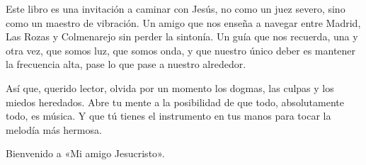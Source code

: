 Este libro es una invitación a caminar con Jesús, no como un juez severo, sino como un maestro de vibración. Un amigo que nos enseña a navegar entre Madrid, Las Rozas y Colmenarejo sin perder la sintonía. Un guía que nos recuerda, una y otra vez, que somos luz, que somos onda, y que nuestro único deber es mantener la frecuencia alta, pase lo que pase a nuestro alrededor.

Así que, querido lector, olvida por un momento los dogmas, las culpas y los miedos heredados. Abre tu mente a la posibilidad de que todo, absolutamente todo, es música. Y que tú tienes el instrumento en tus manos para tocar la melodía más hermosa.

Bienvenido a «Mi amigo Jesucristo».